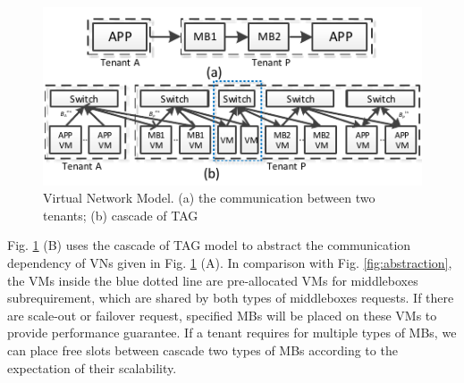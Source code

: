 \documentclass[review]{elsarticle}
\begin{document}
\begin{figure}
	\centering
		\includegraphics[width=3.3 in]{fig/scalability.pdf}
	\caption{Virtual Network Model. (a) the communication between two tenants; (b) cascade of TAG}
	\label{fig:scalability}
\end{figure}

Fig. \ref{fig:scalability} (B) uses the cascade of TAG model to abstract the communication dependency of VNs given in Fig. \ref{fig:scalability} (A). In comparison with Fig. \ref{fig:abstraction}, the VMs inside the blue dotted line are pre-allocated VMs for middleboxes subrequirement, which are shared by both types of middleboxes requests. If there are scale-out or failover request, specified MBs will be placed on these VMs to provide performance guarantee. If a tenant requires for multiple types of MBs, we can place free slots between cascade two types of MBs according to the expectation of their scalability. 

\end{document}
